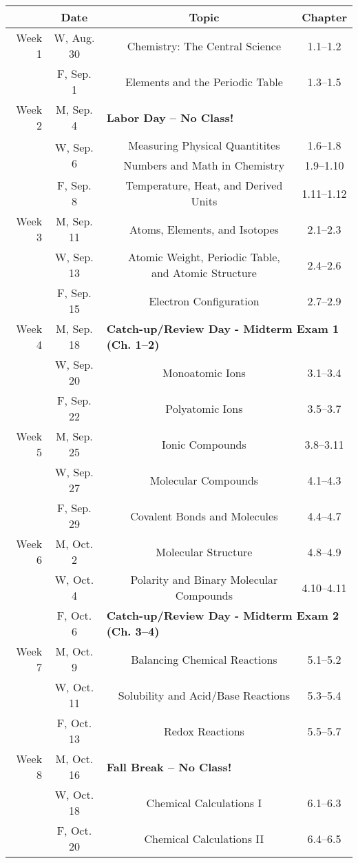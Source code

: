 \begin{tabular}{rcccc}
& Date && Topic & Chapter\\
\midrule
Week 1 & W, Aug. 30&& Chemistry: The Central Science & 1.1--1.2\\
& F, Sep. 1&& Elements and the Periodic Table & 1.3--1.5\\
\midrule
Week 2 & M, Sep. 4& \multicolumn{3}{l}{\textbf{Labor Day -- No Class!}}\\
& \multirow{2}{*}{W, Sep. 6}& & Measuring Physical Quantitites & 1.6--1.8\\
& & & Numbers and Math in Chemistry & 1.9--1.10\\
& F, Sep. 8&& Temperature, Heat, and Derived Units & 1.11--1.12\\
\midrule
Week 3 & M, Sep. 11&& Atoms, Elements, and Isotopes & 2.1--2.3\\
& W, Sep. 13&& Atomic Weight, Periodic Table, and Atomic Structure & 2.4--2.6\\
& F, Sep. 15&& Electron Configuration & 2.7--2.9\\
\midrule
Week 4 & M, Sep. 18& \multicolumn{3}{l}{\textbf{Catch-up/Review Day - Midterm Exam 1 (Ch. 1--2)}}\\
& W, Sep. 20&& Monoatomic Ions & 3.1--3.4\\
& F, Sep. 22&& Polyatomic Ions & 3.5--3.7\\
\midrule
Week 5 & M, Sep. 25&& Ionic Compounds & 3.8--3.11\\
& W, Sep. 27&& Molecular Compounds & 4.1--4.3\\
& F, Sep. 29&& Covalent Bonds and Molecules & 4.4--4.7\\
\midrule
Week 6 & M, Oct. 2&& Molecular Structure & 4.8--4.9\\
& W, Oct. 4&& Polarity and Binary Molecular Compounds & 4.10--4.11\\
& F, Oct. 6& \multicolumn{3}{l}{\textbf{Catch-up/Review Day - Midterm Exam 2 (Ch. 3--4)}}\\
\midrule
Week 7 & M, Oct. 9&& Balancing Chemical Reactions & 5.1--5.2\\
& W, Oct. 11&& Solubility and Acid/Base Reactions & 5.3--5.4\\
& F, Oct. 13&& Redox Reactions & 5.5--5.7\\
\midrule
Week 8 & M, Oct. 16& \multicolumn{3}{l}{\textbf{Fall Break -- No Class!}}\\
& W, Oct. 18&& Chemical Calculations I & 6.1--6.3\\
& F, Oct. 20&& Chemical Calculations II & 6.4--6.5\\

\end{tabular}

